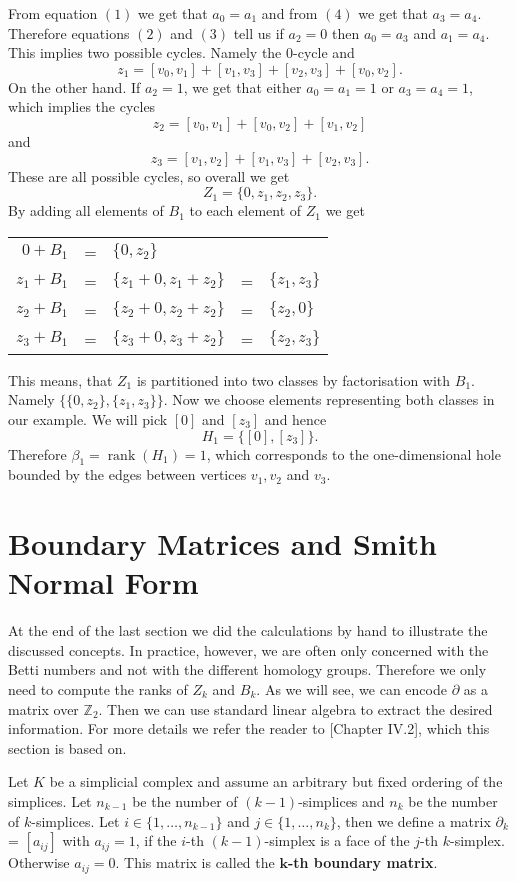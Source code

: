 From equation $(1)$ we get that $a_0 = a_1$ and from $(4)$ we get that $a_3 = a_4$. Therefore equations $(2)$ and $(3)$ tell us if $a_2 = 0$ then $a_0 = a_3$ and $a_1 = a_4$. This implies two possible cycles. Namely the $0$-cycle and \[z_1 = [v_0,v_1]+[v_1,v_3]+[v_2,v_3]+[v_0,v_2].\]
On the other hand. If $a_2 = 1$, we get that either $a_0 = a_1 = 1$ or $a_3 = a_4 = 1$, which implies the cycles 
\[
    z_2 = [v_0,v_1]+[v_0,v_2]+[v_1,v_2]
\]
and 
\[
   z_3 = [v_1,v_2]+[v_1,v_3]+[v_2,v_3].
\]
These are all possible cycles, so overall we get \[
Z_1 = \{0, z_1, z_2, z_3\}.
\]
By adding all elements of $B_1$ to each element of $Z_1$ we get
\begin{center}
\begin{tabular}{rclcl}
    $0+B_1$ &=& $\{0,z_2\}$ &&\\
    $z_1+B_1$&=& $\{z_1 + 0, z_1+z_2\}$&=&$\{z_1,z_3\}$\\
    $z_2+B_1$&=& $\{z_2 + 0, z_2+z_2\}$&=&$\{z_2,0\}$\\
    $z_3+B_1$&=& $\{z_3 + 0, z_3+z_2\}$&=&$\{z_2,z_3\}$
\end{tabular}
\end{center}
This means, that $Z_1$ is partitioned into two classes by factorisation with $B_1$. Namely $\{\{0,z_2\},\{z_1,z_3\}\}$. Now we choose elements representing both classes in our example. We will pick $[0]$ and $[z_3]$ and hence \[
H_1 = \{[0],[z_3]\}.
\]
Therefore $\beta_1 = \operatorname{rank}(H_1) = 1$, which corresponds to the one-dimensional hole bounded by the edges between vertices $v_1,v_2$ and $v_3$. 

\section{Boundary Matrices and Smith Normal Form}
\label{sec:boundary_matrices_and_smith_normal_form}
At the end of the last section we did the calculations by hand to illustrate the discussed concepts. In practice, however, we are often only concerned with the Betti numbers and not with the different homology groups. Therefore we only need to compute the ranks of $Z_k$ and $B_k$. As we will see, we can encode $\partial$ as a matrix over $\mathbb{Z}_2$. Then we can use standard linear algebra to extract the desired information. For more details we refer the reader to \cite{Computational+Topology}[Chapter IV.2], which this section is based on. 

\begin{defi}
Let $K$ be a simplicial complex and assume an arbitrary but fixed ordering of the simplices. Let $n_{k-1}$ be the number of $(k-1)$-simplices and $n_k$ be the number of $k$-simplices. Let $i \in \{1,\dots,n_{k-1}\}$ and $j \in \{1,\dots,n_k\}$, then we define a matrix $\partial_k$ = $[a_{ij}]$ with $a_{ij} = 1$, if the $i$-th $(k-1)$-simplex is a face of the $j$-th $k$-simplex. Otherwise $a_{ij} = 0$. This matrix is called the \textbf{$\bm{k}$-th boundary matrix}. 
\end{defi}

